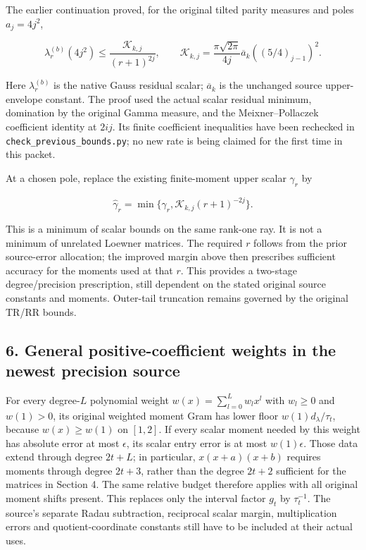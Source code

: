 The earlier continuation proved, for the original tilted parity measures
and poles \(a_j=4j^2\),

\[
 \lambda_r^{(b)}(4j^2)
 \le\frac{\mathcal K_{k,j}}{(r+1)^{2j}},\qquad
 \mathcal K_{k,j}=
 \frac{\pi\sqrt{2\pi}}{4j}\overline a_k((5/4)_{j-1})^2.
\]

Here \(\lambda_r^{(b)}\) is the native Gauss residual scalar;
\(\overline a_k\) is the unchanged source upper-envelope constant. The
proof used the actual scalar residual minimum, domination by the
original Gamma measure, and the Meixner--Pollaczek coefficient identity
at \(2ij\). Its finite coefficient inequalities have been rechecked in
\texttt{check\_previous\_bounds.py}; no new rate is being claimed for
the first time in this packet.

At a chosen pole, replace the existing finite-moment upper scalar
\(\gamma_r\) by

\[
 \widehat\gamma_r=\min\{\gamma_r,\mathcal K_{k,j}(r+1)^{-2j}\}.
\]

This is a minimum of scalar bounds on the same rank-one ray. It is not a
minimum of unrelated Loewner matrices. The required \(r\) follows from
the prior source-error allocation; the improved margin above then
prescribes sufficient accuracy for the moments used at that \(r\). This
provides a two-stage degree/precision prescription, still dependent on
the stated original source constants and moments. Outer-tail truncation
remains governed by the original TR/RR bounds.

\subsection{6. General positive-coefficient weights in the newest
precision
source}\label{general-positive-coefficient-weights-in-the-newest-precision-source}

For every degree-\(L\) polynomial weight \(w(x)=\sum_{l=0}^Lw_lx^l\)
with \(w_l\ge0\) and \(w(1)>0\), its original weighted moment Gram has
lower floor \(w(1)d_\lambda/\tau_t\), because \(w(x)\ge w(1)\) on
\([1,2]\). If every scalar moment needed by this weight has absolute
error at most \(\epsilon\), its scalar entry error is at most
\(w(1)\epsilon\). Those data extend through degree \(2t+L\); in
particular, \(x(x+a)(x+b)\) requires moments through degree \(2t+3\),
rather than the degree \(2t+2\) sufficient for the matrices in Section
4. The same relative budget therefore applies with all original moment
shifts present. This replaces only the interval factor \(g_t\) by
\(\tau_t^{-1}\). The source's separate Radau subtraction, reciprocal
scalar margin, multiplication errors and quotient-coordinate constants
still have to be included at their actual uses.

